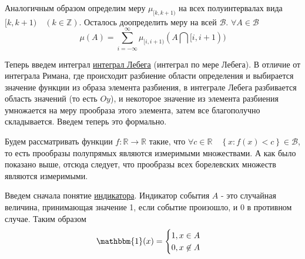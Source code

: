 \documentclass[12pt]{article}
\numberwithin{Th}{section}
\numberwithin{Def}{section}
\numberwithin{Lem}{section}
\numberwithin{St}{section}
\numberwithin{equation}{section}
\newcommand\Set[2]{\left\{ #1 \colon #2 \right\}}
\newcommand\Bor{\mathscr{B}} %
\newcommand\Real{\mathbb{R}} %
\newcommand\Ind{\mathbbm{1}} %
\begin{document}
Аналогичным образом определим меру $\mu_{[k, k+1)}$ на всех полуинтервалах вида $[k, k+1) \quad (k \in \mathbb{Z})$.
Осталось доопределить меру на всей $\Bor$. $\forall A \in \Bor \quad$
 $$\mu(A)=\sum\limits_{i=-\infty}^{\infty}\mu_{[i, i+1)}(A \bigcap [i, i+1))$$
 
 Теперь введем интеграл \underline{интеграл Лебега} (интеграл по мере Лебега). В отличие от интеграла Римана, где происходит разбиение области определения и выбирается
 значение функции из образа элемента разбиения, в интеграле Лебега разбивается область значений (то есть $Oy$), и некоторое значение из элемента разбиения умножается на
 меру прообраза этого элемента, затем все благополучно складывается. Введем теперь это формально.
 
 Будем рассматривать функции $f \colon \Real \to \Real$ такие, что $\forall c \in \Real \quad \Set{x}{f(x) < c} \in \Bor$, то есть прообразы полупрямых являются
  измеримыми множествами. А как было показано выше, отсюда следует, что прообразы всех борелевских множеств являются измеримыми.
  
  Введем сначала понятие \underline{индикатора}. Индикатор события $A$ - это случайная величина, принимающая значение 1, если событие произошло, и 0 в противном случае.
  Таким образом
  \[
  	\Ind(x) = 
  	\begin{cases}
  		1, x \in A \\
  		0, x \not\in A
  	\end{cases}
  \]
  
\end{document}
